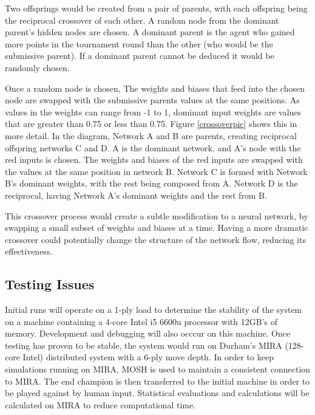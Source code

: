 \documentclass[12pt,a4paper]{article}
\begin{document}
            Two offsprings would be created from a pair of parents, with each offspring being the reciprocal crossover of each other. 
            A random node from the dominant parent's hidden nodes are chosen. A dominant parent is the agent who gained more points in the tournament round than the other (who would be the submissive parent). If a dominant parent cannot be deduced it would be randomly chosen. 
            
            Once a random node is chosen, The weights and biases that feed into the chosen node are swapped with the submissive parents values at the same positions. As values in the weights can range from -1 to 1, dominant input weights are values that are greater than 0.75 or less than 0.75. 
            Figure \ref{crossoverpic} shows this in more detail. In the diagram, Network A and B are parents, creating reciprocal offspring networks C and D. A is the dominant network, and A's node with the red inputs is chosen. The weights and biases of the red inputs are swapped with the values at the same position in network B. Network C is formed with Network B's dominant weights, with the rest being composed from A. Network D is the reciprocal, having Network A's dominant weights and the rest from B.

            This crossover process would create a subtle modification to a neural network, by swapping a small subset of weights and biases at a time. Having a more dramatic crossover could potentially change the structure of the network flow, reducing its effectiveness.
    \subsection{Testing Issues}
        Initial runs will operate on a 1-ply load to determine the stability of the system on a machine containing a 4-core Intel i5 6600u processor with 12GB's of memory. Development and debugging will also occcur on this machine. Once testing has proven to be stable, the system would run on Durham's MIRA (128-core Intel) distributed system with a 6-ply move depth. In order to keep simulations running on MIRA, MOSH is used to maintain a consistent connection to MIRA. The end champion is then transferred to the initial machine in order to be played against by human input. Statistical evaluations and calculations will be calculated on MIRA to reduce computational time.
\end{document}
